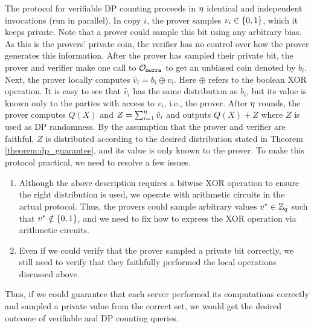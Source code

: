 The protocol for verifiable DP counting proceeds in $\eta$ identical and independent invocations (run in parallel). 
In copy $i$, the prover samples $v_i \in \{ 0, 1\}$, which it keeps private. 
Note that a prover could sample this bit using any arbitrary bias. 
As this is the provers' private coin, the verifier has no control over how the prover generates this information. 
After the prover has sampled their private bit, the prover and verifier make one call to $\mathcal{O}_{\mathtt{morra}}$ to get an unbiased coin denoted by $b_i$. 
Next, the prover locally computes  $\hat{v}_i = b_i \oplus v_i$. Here $\oplus$ refers to the boolean XOR operation. It is easy to see that $\hat{v}_i$ has the same distribution as $b_i$, but its value is known only to the parties with access to $v_i$, i.e., the prover. 
After $\eta$ rounds, the prover computes $Q(X)$ and $Z = \sum_{i=1}^{\eta} \hat{v}_i$ and outputs $Q(X) + Z$ where $Z$ is used as DP randomness.  By the assumption that the prover and verifier are faithful, $Z$ is distributed according to the desired distribution stated in Theorem \ref{theorem:dp_guarantee}, and its value is only known to the prover. 
To make this protocol practical, we need to resolve a few issues.

\begin{enumerate}
    \item{Although the above description requires a bitwise XOR operation to ensure the right distribution is used, we operate with arithmetic circuits in the actual protocol. 
    Thus, the provers could sample arbitrary values $v^* \in \mathbb{Z}_q$ such that $v^* \notin \{ 0, 1\}$, and we need to fix how to express the XOR operation via arithmetic circuits. 
    }

    \item{Even if we could verify that the prover sampled a private bit correctly, we still need to verify that they faithfully performed the local operations discussed above.}
\end{enumerate}

Thus, if we could guarantee that each server performed its computations correctly and sampled a private value from the correct set, we would get the desired outcome of verifiable and DP counting queries.

